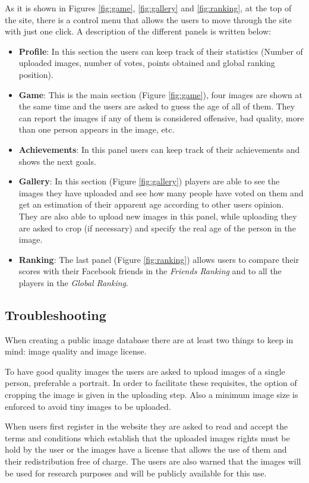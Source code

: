As it is shown in Figures \ref{fig:game}, \ref{fig:gallery} and \ref{fig:ranking}, at the top of the site, there is a control menu that allows the users to move through the site with just one click. A description of the different panels is written below:

\begin{itemize}
	\item \textbf{Profile}: In this section the users can keep track of their statistics (Number of uploaded images, number of votes, points obtained and global ranking position).
	\item \textbf{Game}: This is the main section (Figure \ref{fig:game}), four images are shown at the same time and the users are asked to guess the age of all of them. They can report the images if any of them is considered offensive, bad quality, more than one person appears in the image, etc.
	\item \textbf{Achievements}: In this panel users can keep track of their achievements and shows the next goals.
	\item \textbf{Gallery}: In this section (Figure \ref{fig:gallery}) players are able to see the images they have uploaded and see how many people have voted on them and get an estimation of their apparent age according to other users opinion. They are also able to upload new images in this panel, while uploading they are asked to crop (if necessary) and specify the real age of the person in the image.
	\item \textbf{Ranking}:	The last panel (Figure \ref{fig:ranking}) allows users to compare their scores with their Facebook friends in the \textit{Friends Ranking} and to all the players in the \textit{Global Ranking}.
\end{itemize}

\subsection{Troubleshooting}\label{sec:trouble}

When creating a public image database there are at least two things to keep in mind: image quality and image license.

To have good quality images the users are asked to upload images of a single person, preferable a portrait. In order to facilitate these requisites, the option of cropping the image is given in the uploading step. Also a minimum image size is enforced to avoid tiny images to be uploaded.
 
When users first register in the website they are asked to read and accept the terms and conditions which establish that the uploaded images rights must be hold by the user or the images have a license that allows the use of them and their redistribution free of charge. The users are also warned that the images will be used for research purposes and will be publicly available for this use. 


